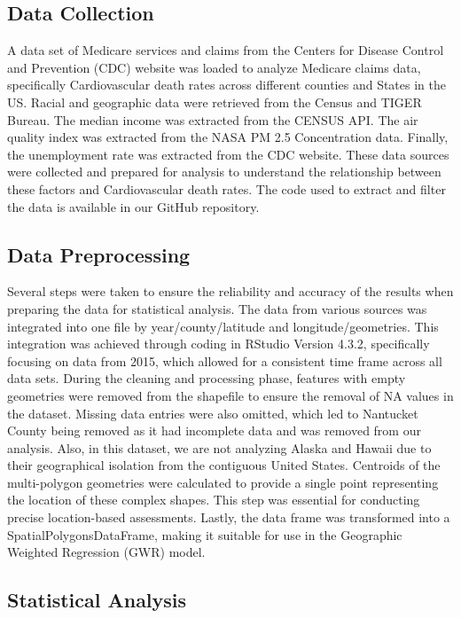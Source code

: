 \documentclass[
]{article}
\begin{document}
\subsection{Data Collection}\label{data-collection}

A data set of Medicare services and claims from the Centers for Disease
Control and Prevention (CDC) website was loaded to analyze Medicare
claims data, specifically Cardiovascular death rates across different
counties and States in the US. Racial and geographic data were retrieved
from the Census and TIGER Bureau. The median income was extracted from
the CENSUS API. The air quality index was extracted from the NASA PM 2.5
Concentration data. Finally, the unemployment rate was extracted from
the CDC website. These data sources were collected and prepared for
analysis to understand the relationship between these factors and
Cardiovascular death rates. The code used to extract and filter the data
is available in our GitHub repository.

\subsection{Data Preprocessing}\label{data-preprocessing}

Several steps were taken to ensure the reliability and accuracy of the
results when preparing the data for statistical analysis. The data from
various sources was integrated into one file by year/county/latitude and
longitude/geometries. This integration was achieved through coding in
RStudio Version 4.3.2, specifically focusing on data from 2015, which
allowed for a consistent time frame across all data sets. During the
cleaning and processing phase, features with empty geometries were
removed from the shapefile to ensure the removal of NA values in the
dataset. Missing data entries were also omitted, which led to Nantucket
County being removed as it had incomplete data and was removed from our
analysis. Also, in this dataset, we are not analyzing Alaska and Hawaii
due to their geographical isolation from the contiguous United States.
Centroids of the multi-polygon geometries were calculated to provide a
single point representing the location of these complex shapes. This
step was essential for conducting precise location-based assessments.
Lastly, the data frame was transformed into a SpatialPolygonsDataFrame,
making it suitable for use in the Geographic Weighted Regression (GWR)
model.

\subsection{Statistical Analysis}\label{statistical-analysis}
\end{document}
